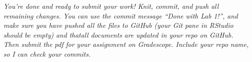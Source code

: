 \documentclass[
]{article}
\begin{document}
\emph{You're done and ready to submit your work! Knit, commit, and push
all remaining changes. You can use the commit message ``Done with Lab
1!'', and make sure you have pushed all the files to GitHub (your Git
pane in RStudio should be empty) and thatall documents are updated in
your repo on GitHub. Then submit the pdf for your assignment on
Gradescope. Include your repo name, so I can check your commits.}
\end{document}

